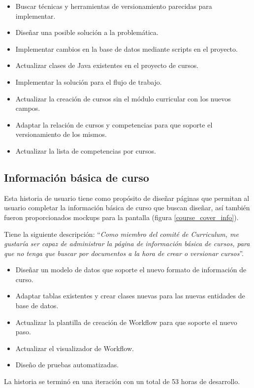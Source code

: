 \begin{itemize}
	\item Buscar técnicas y herramientas de versionamiento parecidas para implementar.
	\item Diseñar una posible solución a la problemática.
	\item Implementar cambios en la base de datos mediante scripts en el proyecto.
	\item Actualizar clases de Java existentes en el proyecto de cursos.
	\item Implementar la solución para el flujo de trabajo.
	\item Actualizar la creación de cursos sin el módulo curricular con los nuevos campos.
	\item Adaptar la relación de cursos y competencias para que soporte el versionamiento de los mismos.
	\item Actualizar la lista de competencias por cursos.
\end{itemize}

\subsection{Información básica de curso}
Esta historia de usuario tiene como propósito de diseñar páginas que permitan al usuario completar la información básica de curso que buscan diseñar, así también fueron proporcionados mockups para la pantalla (figura \ref{course_cover_info}).

Tiene la siguiente descripción: \enquote{\textit{Como miembro del comité de Curriculum, me gustaría ser capaz de administrar la página de información básica de cursos, para que no tenga que buscar por documentos a la hora de crear o versionar cursos}}.

\begin{itemize}
	\item Diseñar un modelo de datos que soporte el nuevo formato de información de curso.
	\item Adaptar tablas existentes y crear clases nuevas para las nuevas entidades de base de datos.
	\item Actualizar la plantilla de creación de Workflow para que soporte el nuevo paso.
	\item Actualizar el visualizador de Workflow.
	\item Diseño de pruebas automatizadas.
\end{itemize}

La historia se terminó en una iteración con un total de 53 horas de desarrollo.

